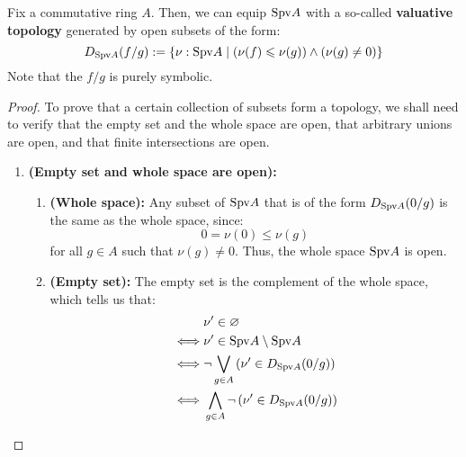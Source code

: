                 \begin{proposition} \label{prop: the_valuative_topology}
                    Fix a commutative ring $A$. Then, we can equip $\Spv A$ with a so-called \textbf{valuative topology} generated by open subsets of the form:
                        $$D_{\Spv A}(f/g) := \{\nu: \Spv A \mid \left(\nu(f) \leq \nu(g)\right) \wedge (\nu(g) \not = 0)\}$$
                    Note that the  $f/g$ is purely symbolic.
                \end{proposition}
                    \begin{proof}
                        To prove that a certain collection of subsets form a topology, we shall need to verify that the empty set and the whole space are open, that arbitrary unions are open, and that finite intersections are open.
                            \begin{enumerate}
                                \item \textbf{(Empty set and whole space are open):} 
                                    \begin{enumerate}
                                        \item \textbf{(Whole space):} Any subset of $\Spv A$ that is of the form $D_{\Spv A}(0/g)$ is the same as the whole space, since:
                                            $$0 = \nu(0) \leq \nu(g)$$
                                        for all $g \in A$ such that $\nu(g) \not = 0$. Thus, the whole space $\Spv A$ is open. 
                                        \item \textbf{(Empty set):} The empty set is the complement of the whole space, which tells us that:
                                            $$
                                                \begin{aligned}
                                                    & \nu' \in \varnothing 
                                                    \\
                                                    \iff & \nu' \in \Spv A \setminus \Spv A
                                                    \\
                                                    \iff & \neg \bigvee_{g \in A} \left(\nu' \in D_{\Spv A}(0/g)\right)
                                                    \\
                                                    \iff & \bigwedge_{g \in A} \neg \left(\nu' \in D_{\Spv A}(0/g)\right)

\end{aligned}$$
\end{enumerate}
\end{enumerate}
\end{proof}
